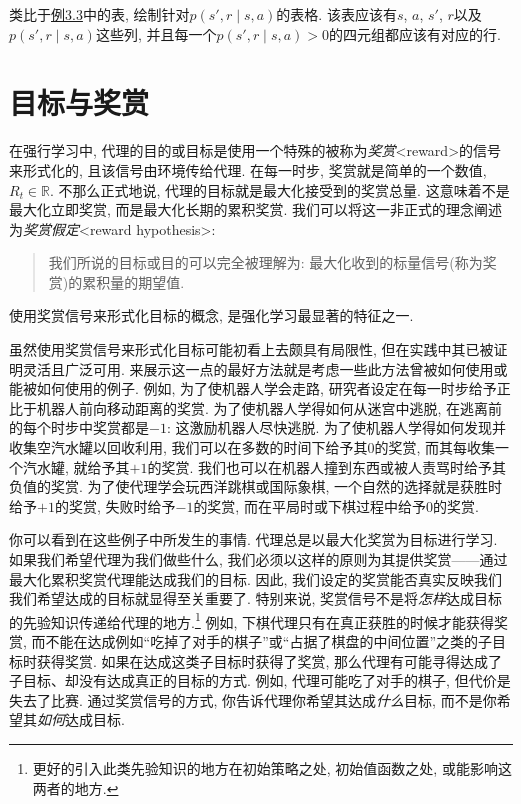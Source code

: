 \begin{exer}
类比于\hyperlink{exam:3.3}{例3.3}中的表, 绘制针对$p(s', r \mid s, a)​$的表格. 该表应该有$s​$, $a​$, $s'​$, $r​$以及$p(s', r \mid s, a)​$这些列, 并且每一个$p(s', r \mid s, a) > 0​$的四元组都应该有对应的行.
\end{exer}

\section{目标与奖赏}\label{sec:3.2}

在强行学习中, 代理的目的或目标是使用一个特殊的被称为\emph{奖赏}<reward>的信号来形式化的, 且该信号由环境传给代理. 在每一时步, 奖赏就是简单的一个数值, $R_t \in \mathbb{R}$. 不那么正式地说, 代理的目标就是最大化接受到的奖赏总量. 这意味着不是最大化立即奖赏, 而是最大化长期的累积奖赏. 我们可以将这一非正式的理念阐述为\emph{奖赏假定}<reward hypothesis>:
\begin{quote}
我们所说的目标或目的可以完全被理解为: 最大化收到的标量信号(称为奖赏)的累积量的期望值.
\end{quote}
使用奖赏信号来形式化目标的概念, 是强化学习最显著的特征之一.

虽然使用奖赏信号来形式化目标可能初看上去颇具有局限性, 但在实践中其已被证明灵活且广泛可用. 来展示这一点的最好方法就是考虑一些此方法曾被如何使用或能被如何使用的例子. 例如, 为了使机器人学会走路, 研究者设定在每一时步给予正比于机器人前向移动距离的奖赏. 为了使机器人学得如何从迷宫中逃脱, 在逃离前的每个时步中奖赏都是$-1$: 这激励机器人尽快逃脱. 为了使机器人学得如何发现并收集空汽水罐以回收利用, 我们可以在多数的时间下给予其0的奖赏, 而其每收集一个汽水罐, 就给予其$+1$的奖赏. 我们也可以在机器人撞到东西或被人责骂时给予其负值的奖赏. 为了使代理学会玩西洋跳棋或国际象棋, 一个自然的选择就是获胜时给予$+1$的奖赏, 失败时给予$-1$的奖赏, 而在平局时或下棋过程中给予0的奖赏.

你可以看到在这些例子中所发生的事情. 代理总是以最大化奖赏为目标进行学习. 如果我们希望代理为我们做些什么, 我们必须以这样的原则为其提供奖赏——通过最大化累积奖赏代理能达成我们的目标. 因此, 我们设定的奖赏能否真实反映我们我们希望达成的目标就显得至关重要了. 特别来说, 奖赏信号不是将\emph{怎样}达成目标的先验知识传递给代理的地方.\footnote{更好的引入此类先验知识的地方在初始策略之处, 初始值函数之处, 或能影响这两者的地方.} 例如, 下棋代理只有在真正获胜的时候才能获得奖赏, 而不能在达成例如``吃掉了对手的棋子''或``占据了棋盘的中间位置''之类的子目标时获得奖赏. 如果在达成这类子目标时获得了奖赏, 那么代理有可能寻得达成了子目标、却没有达成真正的目标的方式. 例如, 代理可能吃了对手的棋子, 但代价是失去了比赛. 通过奖赏信号的方式, 你告诉代理你希望其达成\emph{什么}目标, 而不是你希望其\emph{如何}达成目标.

